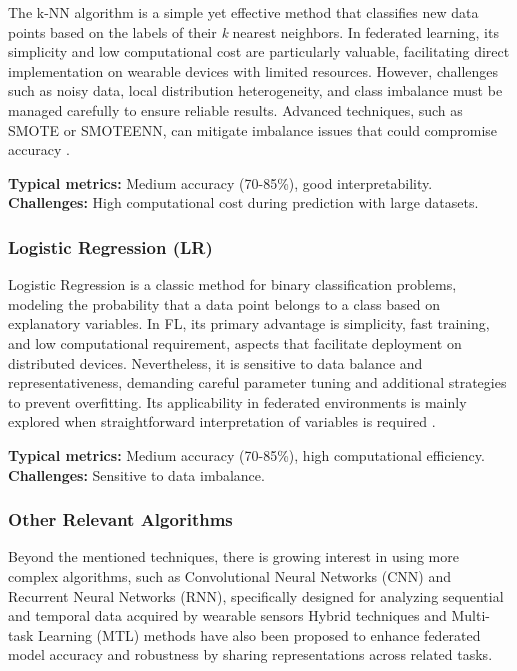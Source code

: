 \documentclass[12pt]{article}
\begin{document}
The k-NN algorithm is a simple yet effective method that classifies new data points based on the labels of their \textit{k} nearest neighbors. In federated learning, its simplicity and low computational cost are particularly valuable, facilitating direct implementation on wearable devices with limited resources. However, challenges such as noisy data, local distribution heterogeneity, and class imbalance must be managed carefully to ensure reliable results. Advanced techniques, such as SMOTE or SMOTEENN, can mitigate imbalance issues that could compromise accuracy \cite{abdulrahman_alahmadi_32bc288c}.

\textbf{Typical metrics:} Medium accuracy (70-85\%), good interpretability.\\
\textbf{Challenges:} High computational cost during prediction with large datasets.

\subsubsection{Logistic Regression (LR)}

Logistic Regression is a classic method for binary classification problems, modeling the probability that a data point belongs to a class based on explanatory variables. In FL, its primary advantage is simplicity, fast training, and low computational requirement, aspects that facilitate deployment on distributed devices. Nevertheless, it is sensitive to data balance and representativeness, demanding careful parameter tuning and additional strategies to prevent overfitting. Its applicability in federated environments is mainly explored when straightforward interpretation of variables is required \cite{abdulrahman_alahmadi_32bc288c}.

\textbf{Typical metrics:} Medium accuracy (70-85\%), high computational efficiency.\\
\textbf{Challenges:} Sensitive to data imbalance.

\subsubsection{Other Relevant Algorithms}

Beyond the mentioned techniques, there is growing interest in using more complex algorithms, such as Convolutional Neural Networks (CNN) and Recurrent Neural Networks (RNN), specifically designed for analyzing sequential and temporal data acquired by wearable sensors \cite{hao_huang_8976046f} Hybrid techniques and Multi-task Learning (MTL) methods have also been proposed to enhance federated model accuracy and robustness by sharing representations across related tasks\cite{mohamed_benouis_35501772}.
\end{document}

